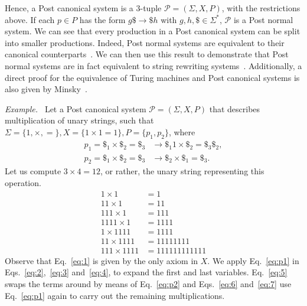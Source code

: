 \documentclass[12pt]{article}
\begin{document}
Hence, a Post canonical system is a $3$-tuple $\mathcal{P} = (\Sigma, X, P)$, with the restrictions above. If each $p \in P$ has the form $g\$ \rightarrow \$h$ with $g, h, \$ \in \Sigma^{*}$, $\mathcal{P}$ is a Post normal system. We can see that every production in a Post canonical system can be split into smaller productions. Indeed, Post normal systems are equivalent to their canonical counterparts~\cite[Theorem 13.1]{Minsky:book:1967}. We can then use this result to demonstrate that Post normal systems are in fact equivalent to string rewriting systems~\cite[Sec. 6.5, Theorem 5.1]{Davis:book:1958}. Additionally, a direct proof for the equivalence of Turing machines and Post canonical systems is also given by Minsky~\cite[Sec. 12.6]{Minsky:book:1967}.

\emph{Example.~\cite[Problem 12-4.3]{Minsky:book:1967}} Let a Post canonical system $\mathcal{P} = (\Sigma, X, P)$ that describes multiplication of unary strings, such that $\Sigma = \{1, \times, =\}, X = \{1 \times 1 = 1\}, P = \{p_{1}, p_{2}\}$, where 
\begin{align}
    p_{1} = \$_{1} \times \$_{2} = \$_{3} &\rightarrow \$_{1}1 \times \$_{2} = \$_{3}\$_{2}, \label{eq:p1} \\
    p_{2} = \$_{1} \times \$_{2} = \$_{3} &\rightarrow \$_{2} \times \$_{1} = \$_{3}. \label{eq:p2}
\end{align}
Let us compute $3 \times 4 = 12$, or rather, the unary string representing this operation.
\begin{align}
    1    \times 1    &= 1            \label{eq:1} \\
    11   \times 1    &= 11           \label{eq:2} \\
    111  \times 1    &= 111          \label{eq:3} \\
    1111 \times 1    &= 1111         \label{eq:4} \\
    1    \times 1111 &= 1111         \label{eq:5} \\
    11   \times 1111 &= 11111111     \label{eq:6} \\
    111  \times 1111 &= 111111111111 \label{eq:7}
\end{align}
Observe that Eq.~\ref{eq:1} is given by the only axiom in $X$. We apply Eq.~\ref{eq:p1} in Eqs.~\ref{eq:2},~\ref{eq:3} and~\ref{eq:4}, to expand the first and last variables. Eq.~\ref{eq:5} swaps the terms around by means of Eq.~\ref{eq:p2} and Eqs.~\ref{eq:6} and~\ref{eq:7} use Eq.~\ref{eq:p1} again to carry out the remaining multiplications.
\end{document}
